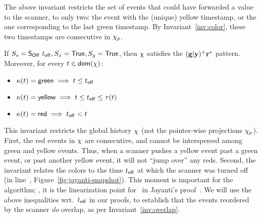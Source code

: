 The above invariant restricts the set of events that could have
forwarded a value to the scanner, to only two: the event with the
(unique) yellow timestamp, or the one corresponding to the last green
timestamp. By Invariant~\ref{inv:color}, these two timestamps are
consecutive in $\chi_p$.


\begin{invariant}\label{inv:redzone}%
If $S_s = \mathsf{S_{Off}}\ t_{\mathsf{off}}, S_x = \mathsf{True}, S_y = \mathsf{True}$, then $\chi$ satisfies
the ${\mathbf{{{(g | y)^{+}}}{r^{*}}}}$ pattern. Moreover, for every $t \in \mathsf{dom}(\chi)$:
%
\begin{itemize}
\item $\kappa(t) = \mathsf{green} \implies t \leq t_{\mathsf{off}}$
\item $\kappa(t) = \mathsf{yellow} \implies t \leq t_{\mathsf{off}} \leq \tau (t)$
\item $\kappa(t) = \mathsf{red} \implies t_{\mathsf{off}} < t$  
\end{itemize}
\end{invariant}

This invariant restricts the global history $\chi$ (not the
pointer-wise projections $\chi_p$). First, the red events in $\chi$
are consecutive, and cannot be interspersed among green and yellow
events. Thus, when a scanner pushes a yellow event past a green event,
or past another yellow event, it will not ``jump over'' any
reds. Second, the invariant relates the colors to the time $t_{\mathsf{off}}$ at
which the scanner was turned off (in line~\lineScanUnsetsS,
Figure~\ref{fig:jayanti-snapshot}). This moment is important for the
algorithm; \eg, it is the linearization point for \jyscan~in
Jayanti's proof~\cite{Jayanti+STOC05}.
%
We will use the above inequalities wrt.~$t_{\mathsf{off}}$ in our proofs, to
establish that the events reordered by the scanner \emph{do} overlap,
as per Invariant~\ref{inv:overlap}.

